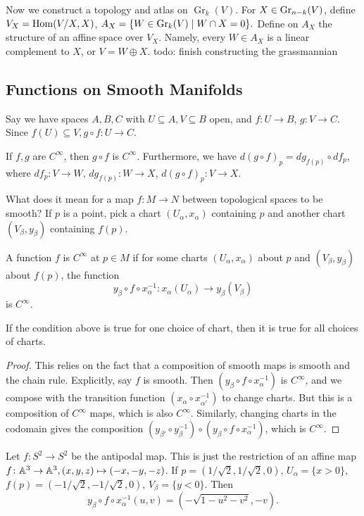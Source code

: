 \begin{example}
\begin{enumerate}[label=(\arabic*)]
            Now we construct a topology and atlas on $\operatorname{Gr}_k(V)$. For $X \in \operatorname{Gr}_{n-k}(V)$, define $V_X= \operatorname{Hom} (V /X,X)$, $A_X= \{W \in \operatorname{Gr}_k(V)\mid W\cap X=0\} .$ Define on $A_X$ the structure of an affine space over $V_X$. Namely, every $W \in A_X$ is a linear complement to $X$, or $V=W \oplus X$. {\color{red} todo: finish constructing the grassmannian}
    \end{enumerate}
\end{example}

\subsection{Functions on Smooth Manifolds}
Say we have spaces $A,B,C$ with $U \subseteq A, V \subseteq B$ open, and $f \colon U \to B$, $g \colon V \to C$. Since $f(U) \subseteq V, g \circ f \colon U \to C$.
\begin{theorem}
    If $f,g$ are $C^{\infty}$, then $g \circ f$ is $C^{\infty}$. Furthermore, we have $d( g \circ f) _p = dg _{f(p)}\circ df_p$, where $df_p \colon V \to W$, $dg _{f(p)}\colon W \to X$, $d(g \circ f)_p \colon V \to X$. 
\end{theorem}
What does it mean for a map $f \colon M \to N$ between topological spaces to be smooth? If $p$ is a point, pick a chart $(U_{\alpha }, x_{\alpha })$ containing $p$ and another chart $(V_{\beta }, y _{\beta })$ containing $f(p)$.
\begin{definition}[]
    A function $f$ is $C^{\infty}$ at $p \in M$ if for some charts $(U _{\alpha }, x_{\alpha })$ about $p$ and $(V _{\beta },y _{\beta })$ about $f(p)$, the function \[
        y_{\beta }\circ f \circ x _{\alpha }^{-1} \colon x_{\alpha }(U_{\alpha }) \to y_{\beta }(V_{\beta })
    \] is $C^{\infty}$.
\end{definition}
\begin{lemma}
    If the condition above is true for one choice of chart, then it is true for all choices of charts.
\end{lemma}
\begin{proof}
    This relies on the fact that a composition of smooth maps is smooth and the chain rule. Explicitly, say $f$ is smooth. Then $(y_{\beta }\circ f \circ x_{\alpha }^{-1})$ is $C^{\infty}$, and we compose with the transition function $(x _{\alpha }\circ x_{\alpha '}^{-1})$ to change charts. But this is a composition of $C^{\infty}$ maps, which is also $C^{\infty}$. Similarly, changing charts in the codomain gives the composition $(y _{\beta' }\circ y _{\beta }^{-1}) \circ (y _{\beta }\circ f \circ x _{\alpha }^{-1})$, which is $C^{\infty}$.
\end{proof}
\begin{example}
    Let $f \colon S ^2 \to S ^2$ be the antipodal map. This is just the restriction of an affine map $f \colon \mathbb{A}^3 \to \mathbb{A}^3, (x,y,z)\mapsto (-x,-y,-z)$. If $p=(1 /\sqrt{2} , 1/\sqrt{2} ,0)$, $U_{\alpha }=\{x>0\} $, $f(p)=(-1 /\sqrt{2} , -1 /\sqrt{2} ,0)$, $V_{\beta }=\{y<0\} $. Then \[
        y _{\beta }\circ f \circ x _{\alpha }^{-1} (u,v)= \left( -\sqrt{1-u^2-v^2} , -v \right) .
    \] 
\end{example}

